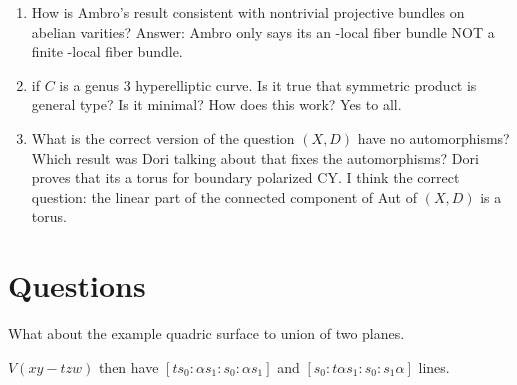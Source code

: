 \documentclass[12pt]{article}
\begin{document}
\begin{enumerate}
\item How is Ambro's result consistent with nontrivial projective bundles on abelian varities? Answer: Ambro only says its an \etale-local fiber bundle NOT a finite \etale-local fiber bundle.

\item if $C$ is a genus $3$ hyperelliptic curve. Is it true that symmetric product is general type? Is it minimal? How does this work? Yes to all. 

\item What is the correct version of the question $(X, D)$ have no automorphisms? Which result was Dori talking about that fixes the automorphisms? Dori proves that its a torus for boundary polarized CY. I think the correct question: the linear part of the connected component of Aut of $(X, D)$ is a torus. 
\end{enumerate}


\section{Questions}

What about the example quadric surface to union of two planes. 

$V(xy - t zw)$ then have $[t s_0 : \alpha s_1 : s_0  : \alpha s_1 ]$ and $[s_0 : t \alpha s_1 : s_0 : s_1 \alpha]$ lines.
\end{document}
